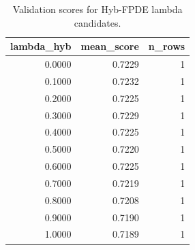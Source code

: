 \begin{table}[t]
\caption{Validation scores for Hyb-FPDE lambda candidates.}
\label{tab:lambda_distribution_computed}
\centering
\begin{tabular}{rrr}
\toprule
lambda\_hyb & mean\_score & n\_rows \\
\midrule
0.0000 & 0.7229 & 1 \\
0.1000 & 0.7232 & 1 \\
0.2000 & 0.7225 & 1 \\
0.3000 & 0.7229 & 1 \\
0.4000 & 0.7225 & 1 \\
0.5000 & 0.7220 & 1 \\
0.6000 & 0.7225 & 1 \\
0.7000 & 0.7219 & 1 \\
0.8000 & 0.7208 & 1 \\
0.9000 & 0.7190 & 1 \\
1.0000 & 0.7189 & 1 \\
\bottomrule
\end{tabular}

\end{table}
